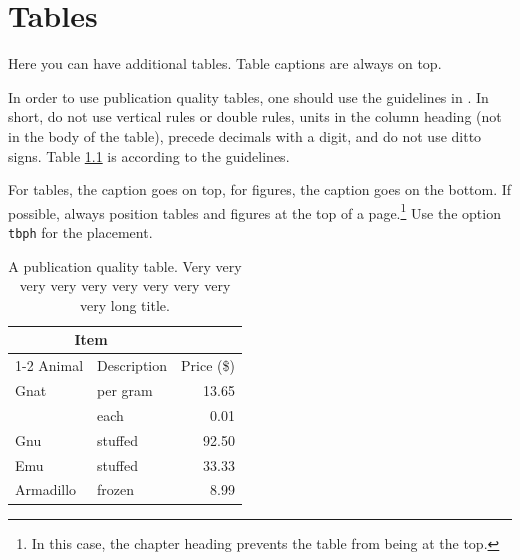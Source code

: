 \chapter{Tables}
Here you can have additional tables. Table captions are always on top.

In order to use publication quality tables, one should use the guidelines in \cite{Fear:2005manual}. In short, do not use vertical rules or double rules, units in the column heading (not in the body of the table), precede decimals with a digit, and do not use ditto signs. Table \ref{table:food} is according to the guidelines. 

For tables, the caption goes on top, for figures, the caption goes on the bottom. If possible, always position tables and figures at the top of a page.\footnote{In this case, the chapter heading prevents the table from being at the top.} Use the option \verb|tbph| for the placement.

\begin{table}[tbph]
\centering
\caption{A publication quality table. Very very very very very very very very very very long title.
\label{table:food}}
\begin{tabular}{@{}llr@{}} \toprule 
\multicolumn{2}{c}{Item} \\ \cmidrule(r){1-2} 
Animal & Description & Price (\$)\\ \midrule 
Gnat & per gram & 13.65 \\ 
& each & 0.01 \\ 
Gnu & stuffed & 92.50 \\ 
Emu & stuffed & 33.33 \\ 
Armadillo & frozen & 8.99 \\ \bottomrule 
\end{tabular}
\end{table}